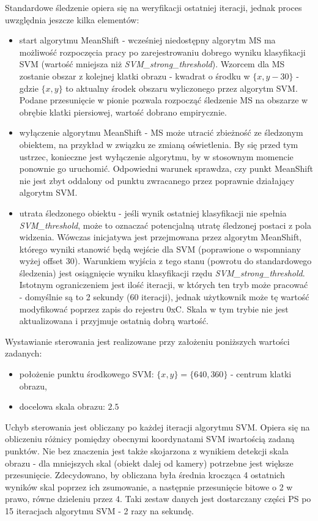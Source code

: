 Standardowe śledzenie opiera się na weryfikacji ostatniej iteracji, jednak proces uwzględnia jeszcze kilka elementów:
\begin{itemize}
	\item start algorytmu MeanShift - wcześniej niedostępny algorytm MS ma możliwość rozpoczęcia pracy po zarejestrowaniu dobrego wyniku klasyfikacji SVM (wartość mniejsza niż \textit{SVM\_strong\_threshold}). Wzorcem dla MS zostanie obszar z kolejnej klatki obrazu - kwadrat o środku w $\{x,y-30\}$ - gdzie $\{x,y\}$ to aktualny środek obszaru wyliczonego przez algorytm SVM. Podane przesunięcie w pionie pozwala rozpocząć śledzenie MS na obszarze w obrębie klatki piersiowej, wartość dobrano empirycznie.
	\item wyłączenie algorytmu MeanShift - MS może utracić zbieżność ze śledzonym obiektem, na przykład w związku ze zmianą oświetlenia. By się przed tym ustrzec, konieczne jest wyłączenie algorytmu, by w stosownym momencie ponownie go uruchomić. Odpowiedni warunek sprawdza, czy punkt MeanShift nie jest zbyt oddalony od punktu zwracanego przez poprawnie działający algorytm SVM.
	\item utrata śledzonego obiektu - jeśli wynik ostatniej klasyfikacji nie spełnia \textit{SVM\_threshold}, może to oznaczać potencjalną utratę śledzonej postaci z pola widzenia. Wówczas inicjatywa jest przejmowana przez algorytm MeanShift, którego wyniki stanowić będą wejście dla SVM (poprawione o wspomniany wyżej offset $30$). Warunkiem wyjścia z tego stanu (powrotu do standardowego śledzenia) jest osiągnięcie wyniku klasyfikacji rzędu \textit{SVM\_strong\_threshold}. Istotnym ograniczeniem jest ilość iteracji, w których ten tryb może pracować - domyślnie są to 2 sekundy (60 iteracji), jednak użytkownik może tę wartość modyfikować poprzez zapis do rejestru 0xC. Skala w tym trybie nie jest aktualizowana i przyjmuje ostatnią dobrą wartość.
\end{itemize} 

Wystawianie sterowania jest realizowane przy założeniu poniższych wartości zadanych:
\begin{itemize}
	\item położenie punktu środkowego SVM: $\{x,y\}=\{640,360\}$ - centrum klatki obrazu,
	\item docelowa skala obrazu: $2.5$
\end{itemize}

Uchyb sterowania jest obliczany po każdej iteracji algorytmu SVM. Opiera się na obliczeniu różnicy pomiędzy obecnymi koordynatami SVM iwartością zadaną punktów. Nie bez znaczenia jest także skojarzona z wynikiem detekcji skala obrazu - dla mniejszych skal (obiekt dalej od kamery) potrzebne jest większe przesunięcie. Zdecydowano, by obliczana była średnia krocząca 4 ostatnich wyników skal poprzez ich zsumowanie, a następnie przesunięcie bitowe o 2 w prawo, równe dzieleniu przez 4. Taki zestaw danych jest dostarczany części PS po 15 iteracjach algorytmu SVM - 2 razy na sekundę.

